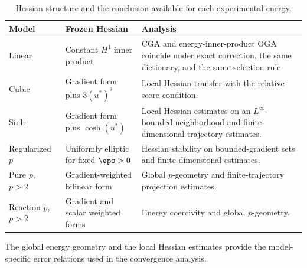 \begin{table}[tbp]
\centering
\small
\caption{Hessian structure and the conclusion available for each experimental energy.}
\label{tab:model-classification}
\begin{tabularx}{\textwidth}{@{}>{\raggedright\arraybackslash}p{}>{\raggedright\arraybackslash}p{}>{\raggedright\arraybackslash}X@{}}
\toprule
Model & Frozen Hessian & Analysis \\
\midrule
Linear & Constant \(H^1\) inner product & CGA and energy-inner-product OGA coincide under exact correction, the same dictionary, and the same selection rule. \\
Cubic & Gradient form plus \(3(u^*)^2\) & Local Hessian transfer with the relative-score condition. \\
Sinh & Gradient form plus \(\cosh(u^*)\) & Local Hessian estimates on an \(L^\infty\)-bounded neighborhood and finite-dimensional trajectory estimates. \\
Regularized \(p\) & Uniformly elliptic for fixed \(\eps>0\) & Hessian stability on bounded-gradient sets and finite-dimensional estimates. \\
Pure \(p\), \(p>2\) & Gradient-weighted bilinear form & Global \(p\)-geometry and finite-trajectory projection estimates. \\
Reaction \(p\), \(p>2\) & Gradient and scalar weighted forms & Energy coercivity and global \(p\)-geometry. \\
\bottomrule
\end{tabularx}
\end{table}

The global energy geometry and the local Hessian estimates provide the model-specific error relations used in the convergence analysis.
